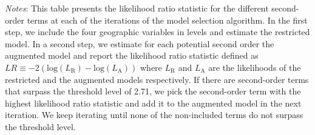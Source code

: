 \begin{table}[H]
    \centering
    \caption{Propensity score estimation: Model selection}
    \label{tab: app_prop_score_model_selection}
    \begin{spacing}{1}
    \end{spacing}
    \parbox{1\textwidth}{
    \vspace{10pt}
    \begin{spacing}{1} 
        {\footnotesize 
        \textit{Notes}: This table presents the likelihood ratio statistic for the different second-order terms at each of the iterations of the model selection algorithm. In the first step, we include the four geographic variables in levels and estimate the restricted model. In a second step, we estimate for each potential second order the augmented model and report the likelihood ratio statistic defined as $LR \equiv -2\left(\text{log}(L_{\text{R}}) - \text{log}(L_{\text{A}})\right)$ where $L_{\text{R}}$ and $L_{\text{A}}$ are the likelihoods of the restricted and the augmented models respectively. If there are second-order terms that surpass the threshold level of 2.71, we pick the second-order term with the highest likelihood ratio statistic and add it to the augmented model in the next iteration. We keep iterating until none of the non-included terms do not surpass the threshold level.}
        \end{spacing}}
\end{table}

